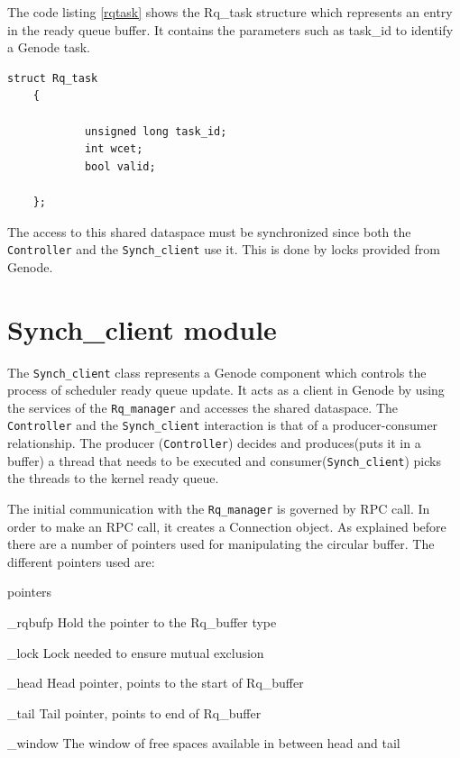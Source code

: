 The code listing \ref{rqtask} shows the Rq\_task structure which represents an entry in the ready queue buffer. It contains the parameters such as task\_id to identify a Genode task.

\begin{lstlisting}[caption={Rq\_task structure},label={rqtask}, style=customcpp]
 struct Rq_task
 	{
 
			unsigned long task_id;
 			int wcet;
 			bool valid;
 
 	};
\end{lstlisting}

The access to this shared dataspace must be synchronized since both the \texttt{Controller} and the \texttt{Synch\_client} use  it. This is done by locks provided from Genode.

\section{Synch\_client module}
The \texttt{Synch\_client} class represents a Genode component which controls the process of scheduler ready queue update. It acts as a client in Genode by using the services of the \texttt{Rq\_manager} and accesses the shared dataspace. The \texttt{Controller} and the \texttt{Synch\_client} interaction is that of a producer-consumer relationship. The producer (\texttt{Controller}) decides and produces(puts it in a buffer) a thread that needs to be executed and consumer(\texttt{Synch\_client}) picks the threads to the kernel ready queue.

The initial communication with the \texttt{Rq\_manager} is governed by RPC call. In order to make an RPC call, it creates a Connection object. As explained before there are a number of pointers used for manipulating the circular buffer. The different pointers used are:

\begin{labeling}{pointers}
	\item [\_rqbufp] Hold the pointer to the Rq\_buffer type
	\item [\_lock] Lock needed to ensure mutual exclusion
	\item [\_head] Head pointer, points to the start of Rq\_buffer
	\item [\_tail] Tail pointer, points to end of Rq\_buffer
	\item [\_window] The window of free spaces available in between head and tail
\end{labeling}
 
